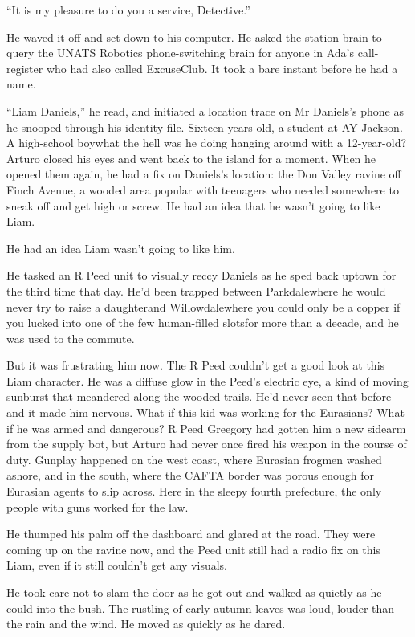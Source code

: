 “It is my pleasure to do you a service, Detective.”

He waved it off and set down to his computer. He asked the station
brain to query the UNATS Robotics phone-switching brain for anyone
in Ada’s call-register who had also called ExcuseClub. It took a
bare instant before he had a name.

“Liam Daniels,” he read, and initiated a location trace on Mr
Daniels’s phone as he snooped through his identity file. Sixteen
years old, a student at AY Jackson. A high-school boy{\dash}what the hell
was he doing hanging around with a 12-year-old? Arturo closed his
eyes and went back to the island for a moment. When he opened them
again, he had a fix on Daniels’s location: the Don Valley ravine
off Finch Avenue, a wooded area popular with teenagers who needed
somewhere to sneak off and get high or screw. He had an idea that
he wasn’t going to like Liam.

He had an idea Liam wasn’t going to like him.

\tb

He tasked an R Peed unit to visually reccy Daniels as he sped back
uptown for the third time that day. He’d been trapped between
Parkdale{\dash}where he would never try to raise a daughter{\dash}and
Willowdale{\dash}where you could only be a copper if you lucked into one
of the few human-filled slots{\dash}for more than a decade, and he was
used to the commute.

But it was frustrating him now. The R Peed couldn’t get a good look
at this Liam character. He was a diffuse glow in the Peed’s
electric eye, a kind of moving sunburst that meandered along the
wooded trails. He’d never seen that before and it made him nervous.
What if this kid was working for the Eurasians? What if he was
armed and dangerous? R Peed Greegory had gotten him a new sidearm
from the supply bot, but Arturo had never once fired his weapon in
the course of duty. Gunplay happened on the west coast, where
Eurasian frogmen washed ashore, and in the south, where the CAFTA
border was porous enough for Eurasian agents to slip across. Here
in the sleepy fourth prefecture, the only people with guns worked
for the law.

He thumped his palm off the dashboard and glared at the road. They
were coming up on the ravine now, and the Peed unit still had a
radio fix on this Liam, even if it still couldn’t get any visuals.

He took care not to slam the door as he got out and walked as
quietly as he could into the bush. The rustling of early autumn
leaves was loud, louder than the rain and the wind. He moved as
quickly as he dared.

